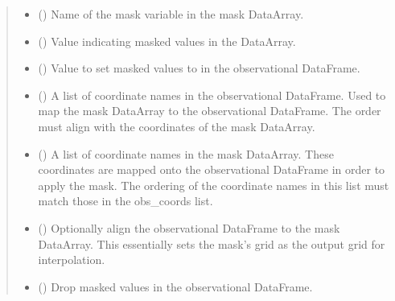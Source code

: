 \documentclass[letterpaper,10pt,english]{sphinxmanual}
\begin{document}
\begin{fulllineitems}
\begin{quote}
\begin{description}
\begin{itemize}
\item {}
\sphinxAtStartPar
{} () \textendash{} Name of the mask variable in the mask DataArray.

\item {}
\sphinxAtStartPar
{} () \textendash{} Value indicating masked values in the DataArray.

\item {}
\sphinxAtStartPar
{} () \textendash{} Value to set masked values to in the observational DataFrame.

\item {}
\sphinxAtStartPar
{} (\sphinxstyleliteralemphasis{\sphinxupquote{{[}}}\sphinxstyleliteralemphasis{\sphinxupquote{{]}}}) \textendash{} A list of coordinate names in the observational DataFrame. Used to map
the mask DataArray to the observational DataFrame. The order must align
with the coordinates of the mask DataArray.

\item {}
\sphinxAtStartPar
{} (\sphinxstyleliteralemphasis{\sphinxupquote{{[}}}\sphinxstyleliteralemphasis{\sphinxupquote{{]}}}) \textendash{} A list of coordinate names in the mask DataArray. These coordinates are
mapped onto the observational DataFrame in order to apply the mask. The
ordering of the coordinate names in this list must match those in the
obs\_coords list.

\item {}
\sphinxAtStartPar
{} () \textendash{} Optionally align the observational DataFrame to the mask DataArray.
This essentially sets the mask’s grid as the output grid for
interpolation.

\item {}
\sphinxAtStartPar
{} () \textendash{} Drop masked values in the observational DataFrame.


\end{itemize}
\end{description}
\end{quote}
\end{fulllineitems}
\end{document}
